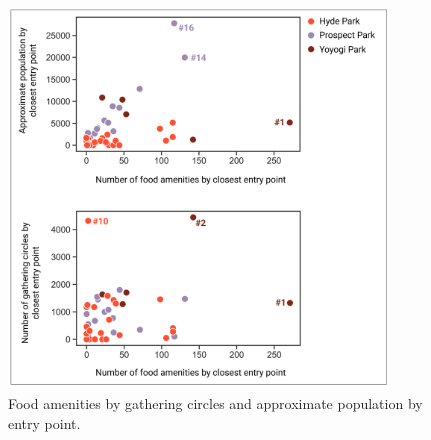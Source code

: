 \begin{figure}[H]
  \centering
  \vspace{8pt}
  \includegraphics[width=0.9\textwidth]{images/network/scatterplots.png}
  \captionsetup{width=0.9\linewidth}
  \caption[Scatter plots]{Food amenities by gathering circles and approximate population by entry point.}
  \label{fig:scatterplots}
\end{figure}\par

